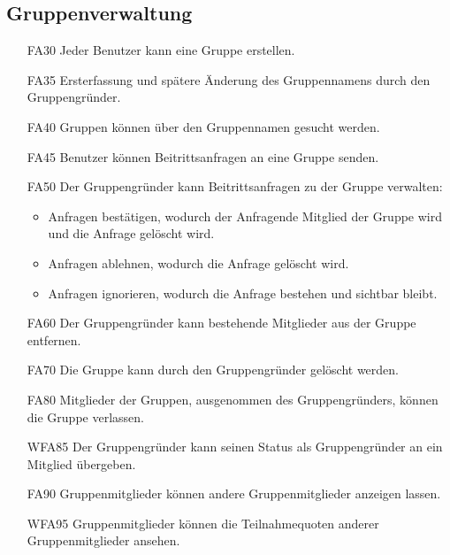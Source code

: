 \documentclass{scrartcl}
\begin{document}
	\subsection{Gruppenverwaltung}
	\begin{itemize}
		\item[FA30] Jeder Benutzer kann eine Gruppe erstellen.
		\item[FA35] Ersterfassung und spätere Änderung des Gruppennamens durch den Gruppengründer.
		\item[FA40] Gruppen können über den Gruppennamen gesucht werden.
		\item[FA45] Benutzer können Beitrittsanfragen an eine Gruppe senden.
		\item[FA50] Der Gruppengründer kann Beitrittsanfragen zu der Gruppe verwalten:
		\begin{itemize}
			\item Anfragen bestätigen, wodurch der Anfragende Mitglied der Gruppe wird und die Anfrage gelöscht wird.
		\end{itemize}
		\begin{itemize}
			\item Anfragen ablehnen, wodurch die Anfrage gelöscht wird.
		\end{itemize}
		\begin{itemize}
			\item Anfragen ignorieren, wodurch die Anfrage bestehen und sichtbar bleibt.
		\end{itemize}
		\item[FA60] Der Gruppengründer kann bestehende Mitglieder aus der Gruppe entfernen.
		\item[FA70] Die Gruppe kann durch den Gruppengründer gelöscht werden.
		\item[FA80] Mitglieder der Gruppen, ausgenommen des Gruppengründers, können die Gruppe verlassen.
		\item[WFA85] Der Gruppengründer kann seinen Status als Gruppengründer an ein Mitglied übergeben.
		\item[FA90] Gruppenmitglieder können andere Gruppenmitglieder anzeigen lassen.
		\item[WFA95] Gruppenmitglieder können die Teilnahmequoten anderer Gruppenmitglieder ansehen.
		
	\end{itemize}
	
\end{document}
